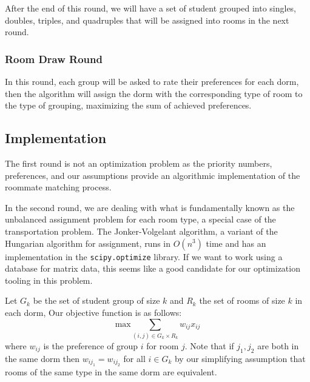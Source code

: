 \documentclass[12pt]{article}
\begin{document}
    After the end of this round, we will have a set of student grouped into singles, doubles, triples, and quadruples that will be assigned into rooms in the next round. 

    \subsubsection*{Room Draw Round}
    In this round, each group will be asked to rate their preferences for each dorm, then the algorithm will assign the dorm with the corresponding type of room to the type of grouping, maximizing the sum of achieved preferences.

    \subsection*{Implementation}
    The first round is not an optimization problem as the priority numbers, preferences, and our assumptions provide an algorithmic implementation of the roommate matching process. 
    
    In the second round, we are dealing with what is fundamentally known as the unbalanced assignment problem for each room type, a special case of the transportation problem. The Jonker-Volgelant algorithm, a variant of the Hungarian algorithm for assignment, runs in $O(n^3)$ time and has an implementation in the \texttt{scipy.optimize} library. If we want to work using a database for matrix data, this seems like a good candidate for our optimization tooling in this problem. 
    
    Let $G_k$ be the set of student group of size $k$ and $R_k$ the set of rooms of size $k$ in each dorm, Our objective function is as follows:
    \[\text{max} \sum_{(i,j) \in G_k \times R_k}  w_{ij}x_{ij}  \]
    where $w_{ij}$ is the preference of group $i$ for room $j$. Note that if $j_1,j_2$ are both in the same dorm then $w_{ij_1} = w_{ij_2}$ for all $i \in G_k$ by our simplifying assumption that rooms of the same type in the same dorm are equivalent.
    
\end{document}
